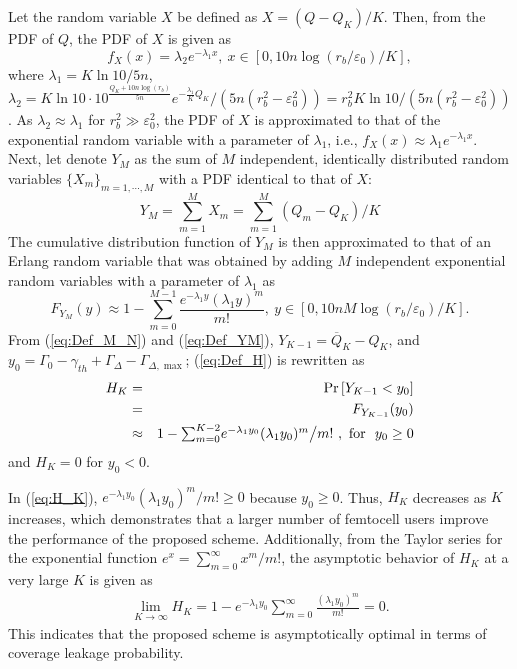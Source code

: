 \documentclass[draftclsnofoot,12pt,onecolumn]{IEEEtran}
\begin{document}
Let the random variable $X$ be defined as $X=\left(Q-Q_K\right)/K$.
Then, from the PDF of $Q$, the PDF of $X$ is given as
\begin{equation}
f_X(x)=\lambda_2e^{-\lambda_1x},~x\in\left[0,10n\log\left(r_b/\varepsilon_0\right)/K\right],
\label{eq:PDF_X}
\end{equation}
where $\lambda_1=K\ln10/5n$,
$\lambda_2=K\ln10\cdot10^{\frac{Q_K+10n\log(r_b)}{5n}}e^{-\frac{\lambda_1}{K}Q_K}/(5n\left(r_b^2-\varepsilon_0^2\right))=r_b^2K\ln10/(5n(r_b^2-\varepsilon_0^2))$.
As $\lambda_2\approx\lambda_1$ for $r_b^2\gg\varepsilon_0^2$, the
PDF of $X$ is approximated to that of the exponential random
variable with a parameter of $\lambda_1$, i.e.,
$f_X(x)\approx\lambda_1e^{-\lambda_1x}$.
Next, let denote $Y_M$ as the sum of $M$ independent, identically
distributed random variables $\{X_m\}_{m=1,\cdots,M}$ with a PDF
identical to that of $X$:
\begin{equation}
Y_M=\textstyle{\sum_{m=1}^{M}}X_m=\textstyle{\sum_{m=1}^{M}}\left(Q_m-Q_K\right)/K\label{eq:Def_YM}
\end{equation}
The cumulative distribution function of $Y_M$ is then approximated
to that of an Erlang random variable that was obtained by adding $M$
independent exponential random variables with a parameter of
$\lambda_1$ as \cite{Garcia}
\begin{equation}
F_{Y_M}(y)\approx
1-\sum_{m=0}^{M-1}\frac{e^{-\lambda_1y}(\lambda_1y)^{m}}{m!}
,~y\in\left[0,10nM\log\left(r_b/\varepsilon_0\right)/K\right].
\label{eq:CDF_YM}
\end{equation}
From (\ref{eq:Def_M_N}) and (\ref{eq:Def_YM}),
$Y_{K-1}=\overline{Q}_K-Q_K$, and
$y_0=\Gamma_0-\gamma_{th}+\Gamma_{\Delta}-\Gamma_{\Delta,\max}$;
(\ref{eq:Def_H}) is rewritten as
\begin{eqnarray}
H_K&=&\mathrm{Pr}\left[Y_{K-1}<y_0\right]\cr
&=& F_{Y_{K-1}}(y_0)\cr
&\approx&
1-\textstyle{\sum_{m=0}^{K-2}}e^{-\lambda_1y_{0}}(\lambda_1y_0)^m\big/m!~,~
\textrm{for}~~y_0\geq 0\label{eq:H_K}
\end{eqnarray}
and $H_K=0$ for $y_0<0$.

In (\ref{eq:H_K}), $e^{-\lambda_1y_{0}}(\lambda_1y_0)^m/m! \geq0$
because $y_0\geq0$. Thus, $H_K$ decreases as $K$ increases, which
demonstrates that a larger number of femtocell users improve the
performance of the proposed scheme. Additionally, from the Taylor
series for the exponential function $e^x=\sum_{m=0}^{\infty}x^m/m!$,
the asymptotic behavior of $H_K$ at a very large $K$ is given as
\begin{eqnarray}
\lim_{K\rightarrow\infty}
H_K=1-e^{-\lambda_1y_{0}}\sum_{m=0}^{\infty}\frac{(\lambda_1y_0)^m}{m!}=
0.\label{eq:Def_Hinf}
\end{eqnarray}
This indicates that the proposed scheme is asymptotically optimal in
terms of coverage leakage probability.
\end{document}
